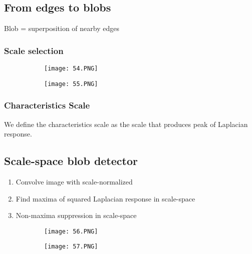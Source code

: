 \documentclass{article}
\begin{document}
\subsection{From edges to blobs}


Blob = superposition of nearby edges

\subsubsection{Scale selection}


\begin{figure}[ht!]
  \centering
  \begin{subfigure}[b]{0.4\linewidth}
    \texttt{[image: 54.PNG]}
  \end{subfigure}
  \begin{subfigure}[b]{0.4\textwidth}
         \centering
         \texttt{[image: 55.PNG]}
     \end{subfigure}
\end{figure}

\subsubsection{Characteristics Scale}

We define the characteristics scale as the scale that produces peak of Laplacian response.

\subsection{Scale-space blob detector}

\begin{enumerate}
    \item Convolve image with scale-normalized
    \item Find maxima of squared Laplacian response in scale-space
    \item Non-maxima suppression in scale-space
\end{enumerate}


\begin{figure}[ht!]
  \centering
  \begin{subfigure}[b]{0.4\linewidth}
    \texttt{[image: 56.PNG]}
  \end{subfigure}
  \begin{subfigure}[b]{0.4\textwidth}
         \centering
         \texttt{[image: 57.PNG]}
     \end{subfigure}
\end{figure}
\end{document}
